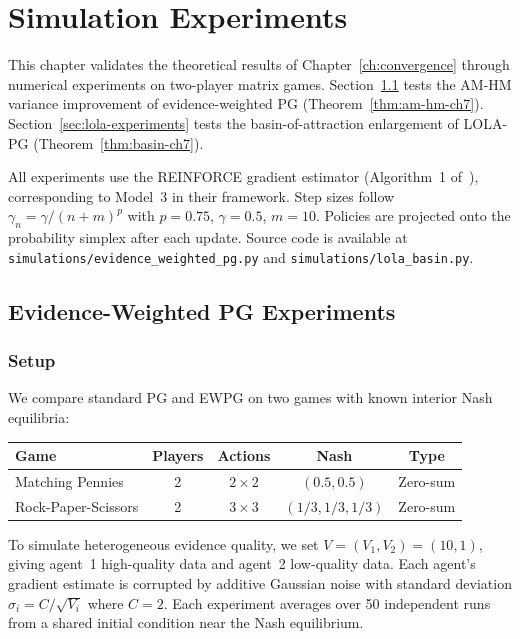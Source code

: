 \chapter{Simulation Experiments}
\label{ch:simulations}

This chapter validates the theoretical results of Chapter~\ref{ch:convergence} through numerical experiments on two-player matrix games. Section~\ref{sec:ewpg-experiments} tests the AM-HM variance improvement of evidence-weighted PG (Theorem~\ref{thm:am-hm-ch7}). Section~\ref{sec:lola-experiments} tests the basin-of-attraction enlargement of LOLA-PG (Theorem~\ref{thm:basin-ch7}).

All experiments use the REINFORCE gradient estimator (Algorithm~1 of~\cite{giannou2022}), corresponding to Model~3 in their framework. Step sizes follow $\gamma_n = \gamma/(n+m)^p$ with $p = 0.75$, $\gamma = 0.5$, $m = 10$. Policies are projected onto the probability simplex after each update. Source code is available at \texttt{simulations/evidence\_weighted\_pg.py} and \texttt{simulations/lola\_basin.py}.


\section{Evidence-Weighted PG Experiments}
\label{sec:ewpg-experiments}

\subsection{Setup}

We compare standard PG and EWPG on two games with known interior Nash equilibria:

\begin{center}
\renewcommand{\arraystretch}{1.2}
\begin{tabular}{lcccc}
\hline
\textbf{Game} & \textbf{Players} & \textbf{Actions} & \textbf{Nash} & \textbf{Type} \\
\hline
Matching Pennies & 2 & $2 \times 2$ & $(0.5, 0.5)$ & Zero-sum \\
Rock-Paper-Scissors & 2 & $3 \times 3$ & $(1/3, 1/3, 1/3)$ & Zero-sum \\
\hline
\end{tabular}
\end{center}

To simulate heterogeneous evidence quality, we set $V = (V_1, V_2) = (10, 1)$, giving agent~1 high-quality data and agent~2 low-quality data. Each agent's gradient estimate is corrupted by additive Gaussian noise with standard deviation $\sigma_i = C/\sqrt{V_i}$ where $C = 2$. Each experiment averages over 50 independent runs from a shared initial condition near the Nash equilibrium.

